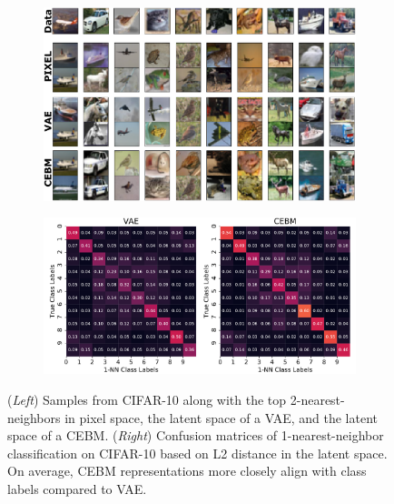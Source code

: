 \documentclass{article}
\begin{document}
\begin{figure}[!t]
\centering
\begin{subfigure}{0.5\textwidth}
\centering
\includegraphics[width=\linewidth]{figures/overview_figure.pdf}
\end{subfigure}%
\begin{subfigure}{0.5\textwidth}
\centering
\includegraphics[width=\linewidth]{figures/confusion_matrix_22row_cifar10.pdf}
\end{subfigure}
\caption{(\emph{Left}) Samples from CIFAR-10 along with the top 2-nearest-neighbors in pixel space, the latent space of a VAE, and the latent space of a CEBM. (\emph{Right}) Confusion matrices of 1-nearest-neighbor classification on CIFAR-10 based on L2 distance in the latent space. On average, CEBM representations more closely align with class labels compared to VAE.}
\label{fig:nearest-neighbours}
\end{figure}
\end{document}
